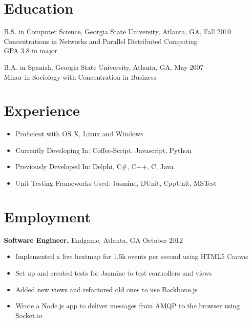\documentclass[margin]{res}
\begin{document}
 
 
 
\address{{\bf Present Address} \\ 204 Drexel Ave Apt B \\ Decatur, GA 30030  \\
        (678-773-1545 }
 
\begin{resume} 
 
\section{Education} 
    B.S. in Computer Science, Georgia State University, Atlanta, GA, Fall 2010  \\
    Concentrations in Networks and Parallel Distributed Computing \\
    GPA 3.8 in major

    B.A. in Spanish, Georgia State University, Atlanta, GA, May 2007 \\
    Minor in Sociology with Concentration in Business
 

\section{Experience}
    \begin{itemize} \itemsep -2pt  %
        \item Proficient with OS X, Linux and Windows
        \item Currently Developing In: Coffee-Script, Javascript, Python
        \item Previously Developed In: Delphi, C\#, C++, C, Java
        \item Unit Testing Frameworks Used: Jasmine, DUnit, CppUnit, MSTest
    \end{itemize}

\section{Employment} 

    {\bf Software Engineer,} Endgame, Atlanta, GA \hfill October 2012 
        \begin{itemize} \itemsep -2pt %
            \item Implemented a live  heatmap for 1.5k events per second using HTML5 Canvas
            \item Set up and created tests for Jasmine to test controllers and views
            \item Added new views and refactored old ones to use Backbone.js
            \item Wrote a Node.js app to deliver messages from AMQP to the browser using
                Socket.io
        \end{itemize}


\end{resume}
\end{document}
